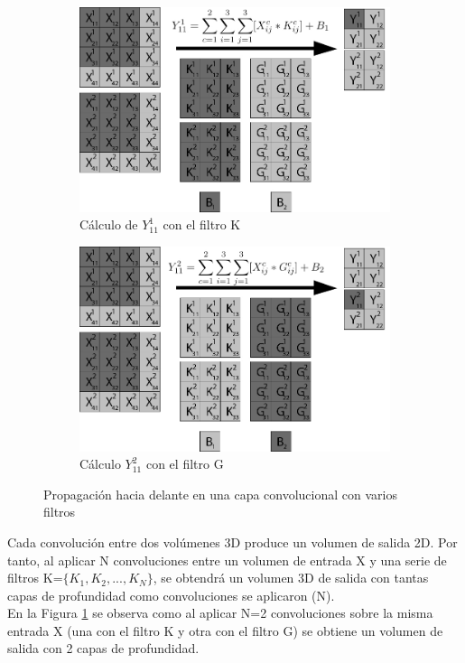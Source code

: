 \begin{figure}[H]
	\centering
	\begin{subfigure}{.5\textwidth}
		\hspace{-10mm}
		\includegraphics[width=1.2\linewidth]{imagenes/conv_2kernels_1.jpg}  
		\caption{Cálculo de $Y^1_{11}$ con el filtro K}
	\end{subfigure}%
	\begin{subfigure}{.5\textwidth}
		\hspace{10mm}
		\includegraphics[width=1.2\linewidth]{imagenes/conv_2kernels_2.jpg}  
		\caption{Cálculo $Y^2_{11}$ con el filtro G}
	\end{subfigure}
	\caption{Propagación hacia delante en una capa convolucional con varios filtros}
	\label{fig:forward_prop_convolucional_varios_kernels}
\end{figure}

Cada convolución entre dos volúmenes 3D produce un volumen de salida 2D. Por tanto, al aplicar N convoluciones entre un volumen de entrada X y una serie de filtros K=$\{K_1, K_2, ..., K_N\}$, se obtendrá un volumen 3D de salida con tantas capas de profundidad como convoluciones se aplicaron (N). \\
En la Figura \ref{fig:forward_prop_convolucional_varios_kernels} se observa como al aplicar N=2 convoluciones sobre la misma entrada X (una con el filtro K y otra con el filtro G) se obtiene un volumen de salida con 2 capas de profundidad. \cite{capa_convolucional_Stanford}


